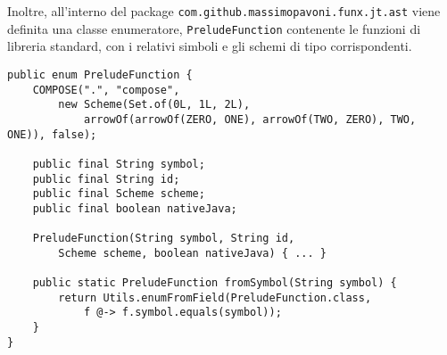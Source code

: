 Inoltre, all'interno del package \texttt{com.github.massimopavoni.funx.jt.ast} viene definita una classe enumeratore,
\texttt{PreludeFunction} contenente le funzioni di libreria standard, con i relativi simboli e gli schemi di tipo corrispondenti.

\vspace{4mm}
\begin{lstlisting}[caption={Parte del codice di \texttt{PreludeFunction}}, style=javaCode, label={lst:5-preludefunction-java}]
public enum PreludeFunction {
    COMPOSE(".", "compose",
        new Scheme(Set.of(0L, 1L, 2L),
            arrowOf(arrowOf(ZERO, ONE), arrowOf(TWO, ZERO), TWO, ONE)), false);

    public final String symbol;
    public final String id;
    public final Scheme scheme;
    public final boolean nativeJava;

    PreludeFunction(String symbol, String id,
        Scheme scheme, boolean nativeJava) { ... }

    public static PreludeFunction fromSymbol(String symbol) {
        return Utils.enumFromField(PreludeFunction.class,
            f @-> f.symbol.equals(symbol));
    }
}
\end{lstlisting}

\newpage

